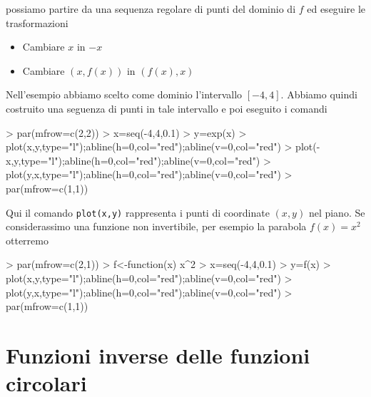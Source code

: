\documentclass[onecolumn,11pt]{book}
\begin{document}
possiamo partire da una sequenza regolare di punti del dominio  di $f$ ed eseguire le trasformazioni  
\begin{itemize}
\item Cambiare $x$ in $-x$
\item Cambiare $(x,f(x))$ in $(f(x),x)$
\end{itemize}
Nell'esempio abbiamo scelto come dominio l'intervallo $[-4,4]$. Abbiamo quindi costruito una seguenza di punti in tale intervallo e poi eseguito i comandi
\begin{Schunk}
\begin{Sinput}
> par(mfrow=c(2,2))
> x=seq(-4,4,0.1)
> y=exp(x)
> plot(x,y,type="l");abline(h=0,col="red");abline(v=0,col="red")
> plot(-x,y,type="l");abline(h=0,col="red");abline(v=0,col="red")
> plot(y,x,type="l");abline(h=0,col="red");abline(v=0,col="red")
> par(mfrow=c(1,1))
\end{Sinput}
\end{Schunk}
Qui il comando \texttt{plot(x,y)} rappresenta i punti di coordinate $(x,y)$ nel piano.
Se considerassimo una funzione non invertibile, per esempio la parabola 
$f(x)=x^2$
otterremo
\begin{Schunk}
\begin{Sinput}
> par(mfrow=c(2,1))
> f<-function(x) x^2
> x=seq(-4,4,0.1)
> y=f(x)
> plot(x,y,type="l");abline(h=0,col="red");abline(v=0,col="red")
> plot(y,x,type="l");abline(h=0,col="red");abline(v=0,col="red")
> par(mfrow=c(1,1))
\end{Sinput}
\end{Schunk}
\section{Funzioni inverse delle funzioni circolari}
\end{document}

